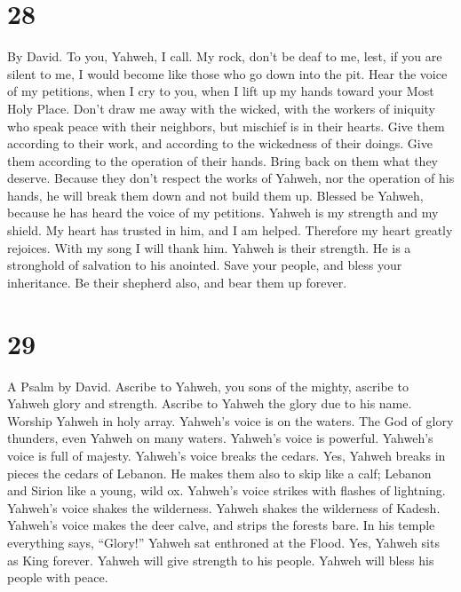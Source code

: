 \hypertarget{section-27}{%
\section{28}\label{section-27}}

By David.  To you, Yahweh, I call. My rock, don't be deaf to
me, lest, if you are silent to me, I would become like those who go down
into the pit.  Hear the voice of my petitions, when I cry to
you, when I lift up my hands toward your Most Holy Place. 
Don't draw me away with the wicked, with the workers of iniquity who
speak peace with their neighbors, but mischief is in their hearts.
 Give them according to their work, and according to the
wickedness of their doings. Give them according to the operation of
their hands. Bring back on them what they deserve.  Because
they don't respect the works of Yahweh, nor the operation of his hands,
he will break them down and not build them up.  Blessed be
Yahweh, because he has heard the voice of my petitions. 
Yahweh is my strength and my shield. My heart has trusted in him, and I
am helped. Therefore my heart greatly rejoices. With my song I will
thank him.  Yahweh is their strength. He is a stronghold of
salvation to his anointed.  Save your people, and bless your
inheritance. Be their shepherd also, and bear them up forever.

\hypertarget{section-28}{%
\section{29}\label{section-28}}

A Psalm by David.  Ascribe to Yahweh, you sons of the
mighty, ascribe to Yahweh glory and strength.  Ascribe to
Yahweh the glory due to his name. Worship Yahweh in holy array.
 Yahweh's voice is on the waters. The God of glory thunders,
even Yahweh on many waters.  Yahweh's voice is powerful.
Yahweh's voice is full of majesty.  Yahweh's voice breaks
the cedars. Yes, Yahweh breaks in pieces the cedars of Lebanon.
 He makes them also to skip like a calf; Lebanon and Sirion
like a young, wild ox.  Yahweh's voice strikes with flashes
of lightning.  Yahweh's voice shakes the wilderness. Yahweh
shakes the wilderness of Kadesh.  Yahweh's voice makes the
deer calve, and strips the forests bare. In his temple everything says,
``Glory!''  Yahweh sat enthroned at the Flood. Yes, Yahweh
sits as King forever.  Yahweh will give strength to his
people. Yahweh will bless his people with peace.

